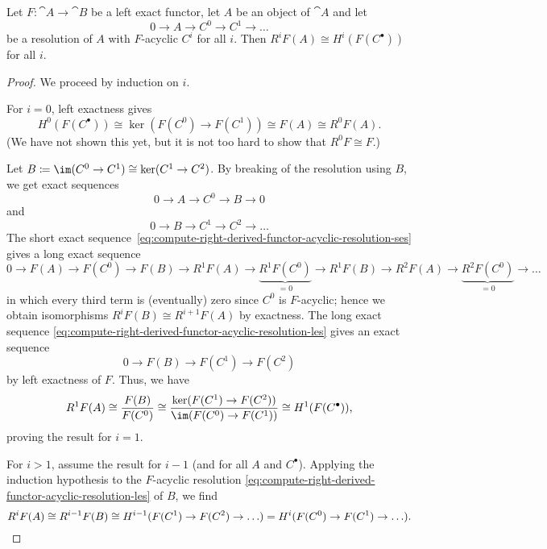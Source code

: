 \begin{lem}\label{lem:compute-right-derived-functor-acyclic-resolution}
Let \(F\colon\cat A\to\cat B\) be a left exact functor, let \(A\) be an object of \(\cat A\) and let
\[0\to A\to C^0\to C^1\to\ldots\]
be a resolution of \(A\) with \(F\)-acyclic \(C^i\) for all \(i\).
Then \(R^iF(A)\cong H^i(F(C^\bullet))\) for all \(i\).
\end{lem}
\begin{proof}
We proceed by induction on \(i\).

For \(i=0\), left exactness gives
\[ H^0(F(C^\bullet)) \cong \ker(F(C^0)\to F(C^1)) \cong F(A) \cong R^0F(A)\text{.} \]
(We have not shown this yet, but it is not too hard to show that \(R^0F\cong F\).)

Let \(B\coloneq\im(C^0\to C^1)\cong\ker(C^1\to C^2)\).
By breaking of the resolution using \(B\), we get exact sequences
\begin{equation}
  \label{eq:compute-right-derived-functor-acyclic-resolution-ses}
  0\to A\to C^0\to B\to 0 
\end{equation}
and
\begin{equation}
  \label{eq:compute-right-derived-functor-acyclic-resolution-les}
  0\to B\to C^1\to C^2\to \ldots
\end{equation}
The short exact sequence~\cref{eq:compute-right-derived-functor-acyclic-resolution-ses} gives a long exact sequence
\[ 0\to F(A)\to F(C^0)\to F(B)\to R^1F(A)\to \underbrace{R^1F(C^0)}_{=0}\to R^1F(B)\to R^2F(A)\to \underbrace{R^2F(C^0)}_{=0}\to \ldots \]
in which every third term is (eventually) zero since \(C^0\) is \(F\)-acyclic; hence we obtain isomorphisms \(R^iF(B)\cong R^{i+1}F(A)\) by exactness.
The long exact sequence \cref{eq:compute-right-derived-functor-acyclic-resolution-les} gives an exact sequence
\[ 0\to F(B)\to F(C^1)\to F(C^2) \]
by left exactness of \(F\).
Thus, we have
\[ R^1F(A) \cong \frac{F(B)}{F(C^0)} \cong \frac{\ker(F(C^1)\to F(C^2))}{\im(F(C^0)\to F(C^1))} \cong H^1(F(C^\bullet))\text{,} \]
proving the result for \(i=1\).

For \(i>1\), assume the result for \(i-1\) (and for all \(A\) and \(C^\bullet\)).
Applying the induction hypothesis to the \(F\)-acyclic resolution \cref{eq:compute-right-derived-functor-acyclic-resolution-les} of \(B\), we find
\[ R^iF(A) \cong R^{i-1}F(B) \cong H^{i-1}(F(C^1)\to F(C^2)\to\ldots) = H^i(F(C^0)\to F(C^1)\to\ldots)\text{.} \qedhere \]
\end{proof}

